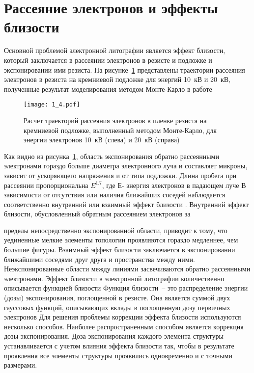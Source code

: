 \section{Рассеяние электронов и эффекты близости}

Основной проблемой электронной литографии является эффект близости, который заключается в рассеянии электронов в резисте и подложке и экспонировании ими резиста. На рисунке~\ref{fig:4} представлены траектории рассеяния электронов в резиста на кремниевой подложке для энергий 10~кВ и 20~кВ, полученные результат моделирования методом Монте-Карло в работе \cite{4}

\begin{figure}[H]
\center
\texttt{[image: 1\_4.pdf]}
\caption{ Расчет траекторий рассеяния электронов в пленке резиста на кремниевой подложке, выполненный методом Монте-Карло, для энергии электронов 10~кВ (слева) и 20~кВ (справа)}
\label{fig:4}
\end{figure}

Как видно из рисунка~\ref{fig:4}, область экспонирования обратно рассеянными электронами гораздо больше диаметра электронного луча и составляет микроны, зависит от ускоряющего напряжения и от типа подложки. Длина пробега при рассеянии пропорциональна $E^{1.7}$, где Е- энергия электронов в падающем луче
В зависимости от отсутствия или наличия ближайших соседей наблюдается соответственно внутренний или взаимный эффект близости . Внутренний эффект близости, обусловленный обратным рассеянием электронов за

пределы непосредственно экспонированной области, приводит к тому, что уединенные мелкие элементы топологии проявляются гораздо медленнее, чем большие фигуры. Взаимный эффект близости заключается в экспонировании ближайшими соседями друг друга и пространства между ними. Неэкспонированные области между линиями засвечиваются обратно рассеянными электронами.
Эффект близости в электронной литографии количественно описывается функцией близости
Функция близости~-- это распределение энергии (дозы) экспонирования, поглощенной в резисте. Она является суммой двух гауссовых функций, описывающих вклады в поглощенную дозу первичных электронов
Для решения проблемы коррекции эффекта близости используются несколько способов. Наиболее распространенным способом является коррекция дозы экспонирования. Доза экспонирования каждого элемента структуры устанавливается с учетом влияния эффекта близости так, чтобы в результате проявления все элементы структуры проявились одновременно и с точными размерами.

